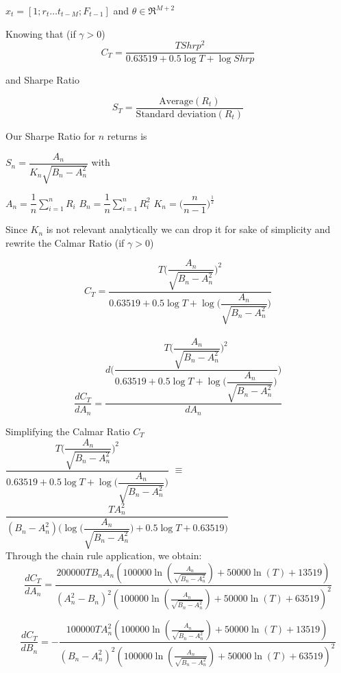 \documentclass[parskip=full]{scrartcl}
\begin{document}
$x_t = [1;r_t \dots t_{t-M};F_{t-1}]$ and $\theta \in \Re^{M+2}$


Knowing that (if $ \gamma > 0 $) $$ C_T  = \dfrac{TShrp^2}{0.63519 + 0.5\log T + \log Shrp}$$

and Sharpe Ratio

$$ S_T = \dfrac{\text{Average}(R_t)}{\text{Standard deviation}(R_t)} $$

Our Sharpe Ratio for $ n $ returns is 

$ S_n = \dfrac{A_n}{K_n\sqrt{B_n - A_{n}^{2}}} $ \cite{moody1998performance} with

\qquad$ A_n = \dfrac{1}{n}\sum_{i=1}^{n}R_i $	\qquad$ B_n = \dfrac{1}{n}\sum_{i=1}^{n}R_{i}^{2} $ \qquad	$ K_n = \bigg(\dfrac{n}{n-1}\bigg)^{\frac{1}{2}} $

Since $K_n$ is not relevant analytically we can drop it for sake of simplicity and rewrite the Calmar Ratio (if $ \gamma > 0 $)

$$ C_T  = \dfrac{T\bigg(\dfrac{A_n}{\sqrt{B_n - A_{n}^{2}}}\bigg)^2}{0.63519 + 0.5\log T + \log \bigg(\dfrac{A_n}{\sqrt{B_n - A_{n}^{2}}}\bigg)}$$\\

$$\dfrac{dC_T}{dA_n} = \dfrac{d\Bigg(\dfrac{T\bigg(\dfrac{A_n}{\sqrt{B_n - A_{n}^{2}}}\bigg)^2}{0.63519 + 0.5\log T + \log \bigg(\dfrac{A_n}{\sqrt{B_n - A_{n}^{2}}}\bigg)}\Bigg)}{dA_n}$$

Simplifying the Calmar Ratio $C_T$\\

$\dfrac{T\bigg(\dfrac{A_n}{\sqrt{B_n - A_{n}^{2}}}\bigg)^2}{0.63519 + 0.5\log T + \log \bigg(\dfrac{A_n}{\sqrt{B_n - A_{n}^{2}}}\bigg)}$
$ \equiv$
$\dfrac{TA_{n}^{2}}{(B_n - A_{n}^{2})\bigg(\log \bigg(\dfrac{A_n}{\sqrt{B_n - A_{n}^{2}}}\bigg)+ 0.5\log T + 0.63519\bigg)}$\\

Through the chain rule application, we obtain:\\

$$ \dfrac{dC_T}{dA_n} = \dfrac{200000TB_nA_n\left(100000\ln\left(\frac{A_n}{\sqrt{B_n-A_{n}^{2}}}\right)+50000\ln\left(T\right)+13519\right)}{\left(A_{n}^{2}-B_n\right)^2\left(100000\ln\left(\frac{A_n}{\sqrt{B_n-A_{n}^{2}}}\right)+50000\ln\left(T\right)+63519\right)^2} $$

$$ \dfrac{dC_T}{dB_n} = -\dfrac{100000TA_{n}^{2}\left(100000\ln\left(\frac{A_n}{\sqrt{B_n-A_{n}^{2}}}\right)+50000\ln\left(T\right)+13519\right)}{\left(B_n-A_{n}^{2}\right)^2\left(100000\ln\left(\frac{A_n}{\sqrt{B_n-A_{n}^{2}}}\right)+50000\ln\left(T\right)+63519\right)^2}$$
\end{document}
